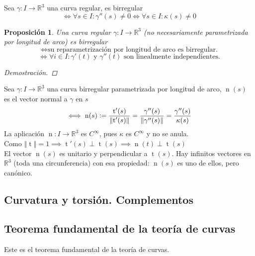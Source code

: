 \documentclass[12pt]{article}
\theoremstyle{plain}
\newtheorem{prop}{Proposición}[subsection]
\newenvironment{dem}[1][]{%
	\begin{adjustwidth}{1cm}{0cm} \begin{proof}[Demostración\ifx\relax#1\relax\else{ (#1)}\fi]
}{\end{proof}\end{adjustwidth}}
\newcommand{\R}{\mathbb{R}}
\newcommand{\norm}[1]{\left\Vert#1\right\Vert}
\newcommand{\appl}[3]{#1 \colon #2 \longrightarrow #3}
\newcommand{\ds}{\displaystyle}
\newcommand{\tex}[1]{\text{#1}}
\newcommand{\defeq}{\vcentcolon=}
\newcommand{\tngnt}{\operatorname{t}}
\newcommand{\nrml}{\operatorname{n}}
\renewcommand{\norm}[1]{\left\Vert#1\right\Vert}
\begin{document}
\begin{defn}
	Sea $\appl{\gamma}{I}{\R^3}$ una curva regular, es birregular \[\ds\iff \forall s \in I : \gamma''(s) \ne 0 \iff\forall s \in I : \kappa(s)\ne 0\]
\end{defn}
\begin{prop}
	Una curva regular $\appl{\gamma}{I}{\R^3}$ (no necesariamente parametrizada por longitud de arco) es birregular \[\iff \tex{su reparametrización por longitud de arco es birregular.}\]
	\[\iff \forall i \in I : \gamma'(t)\tex{ y }\gamma''(t) \tex{ son linealmente independientes.}\]
	\begin{dem}
		
	\end{dem}
\end{prop}
\begin{defn}
	Sea $\appl{\gamma}{I}{\R^3}$ una curva birregular parametrizada por longitud de arco, $\operatorname{n}(s)$ es el vector normal a $\gamma$ en $s$
	\[\iff\operatorname{n}(s)\defeq\frac{\tngnt'(s)}{\norm{\tngnt'(s)}}= \frac{\gamma''(s)}{\norm{\gamma''(s)}}=\frac{\gamma''(s)}{\kappa(s)}\]
	La aplicación $\appl{\operatorname{n}}{I}{\R^3}$ es $C^\infty$, pues $\kappa$ es $C^\infty$ y no se anula. \\
	Como $\norm{\tngnt}=1\implies \tngnt'(s)\perp \tngnt(s) \implies \boxed{\nrml(t) \perp \tngnt(s)}$ \\
	El vector $\nrml(s)$ es unitario y perpendicular a $\tngnt(s)$. Hay infinitos vectores en $\R^3$ (toda una circunferencia) con esa propiedad: $\nrml(s)$ es uno de ellos, pero canónico.
\end{defn}
\begin{defn}
	
\end{defn}
\begin{defn}
	
\end{defn}
\begin{defn}
	
\end{defn}
\begin{defn}[Torsión]
	
\end{defn}
\begin{defn}[Planos]
	
\end{defn}

\subsection{Curvatura y torsión. Complementos}
\subsection{Teorema fundamental de la teoría de curvas}

Este es el teorema fundamental de la teoría de curvas.
\end{document}
